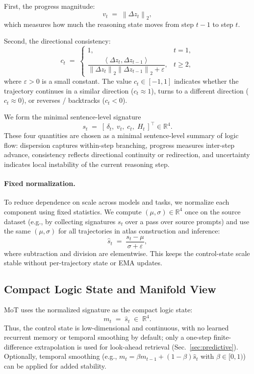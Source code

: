 \documentclass{article}
\newcommand{\R}{\mathbb{R}}
\newcommand{\norm}[1]{\left\lVert #1 \right\rVert}
\newcommand{\inner}[2]{\left\langle #1, #2 \right\rangle}
\newcommand{\eps}{\varepsilon}
\begin{document}
First, the progress magnitude:
\begin{equation}
v_t \;=\; \norm{\Delta z_t}_2,
\label{eq:speed}
\end{equation}
which measures how much the reasoning state moves from step $t-1$ to step $t$.

Second, the directional consistency:
\begin{equation}
c_t \;=\;
\begin{cases}
1, & t=1,\\[4pt]
\dfrac{\inner{\Delta z_t}{\Delta z_{t-1}}}
{\norm{\Delta z_t}_2 \norm{\Delta z_{t-1}}_2 + \eps}, & t\ge 2,
\end{cases}
\label{eq:consistency}
\end{equation}
where $\eps>0$ is a small constant. 
The value $c_t\in[-1,1]$ indicates whether the trajectory continues in a similar direction ($c_t\approx 1$), turns to a different direction ($c_t\approx 0$), or reverses / backtracks ($c_t<0$).

We form the minimal sentence-level signature
\begin{equation}
s_t \;=\; [\,\delta_t,\; v_t,\; c_t,\; H_t\,]^\top \in \R^4.
\label{eq:st}
\end{equation}
These four quantities are chosen as a minimal sentence-level summary of logic flow: dispersion captures within-step branching, progress measures inter-step advance, consistency reflects directional continuity or redirection, and uncertainty indicates local instability of the current reasoning step.

\paragraph{Fixed normalization.}
To reduce dependence on scale across models and tasks, we normalize each component using fixed statistics. We compute $(\mu,\sigma)\in\R^4$ once on the source dataset (e.g., by collecting signatures $s_t$ over a pass over source prompts) and use the same $(\mu,\sigma)$ for all trajectories in atlas construction and inference:
\begin{equation}
\hat s_t \;=\; \frac{s_t - \mu}{\sigma + \eps},
\label{eq:norm}
\end{equation}
where subtraction and division are elementwise. This keeps the control-state scale stable without per-trajectory state or EMA updates.

\subsection{Compact Logic State and Manifold View}
\label{sec:mt}
MoT uses the normalized signature as the compact logic state:
\begin{equation}
m_t \;=\; \hat s_t \;\in\; \R^4.
\label{eq:mt}
\end{equation}
Thus, the control state is low-dimensional and continuous, with no learned recurrent memory or temporal smoothing by default; only a one-step finite-difference extrapolation is used for look-ahead retrieval (Sec.~\ref{sec:predictive}). Optionally, temporal smoothing (e.g., $m_t = \beta m_{t-1} + (1-\beta)\hat s_t$ with $\beta \in [0,1)$) can be applied for added stability.
\end{document}
